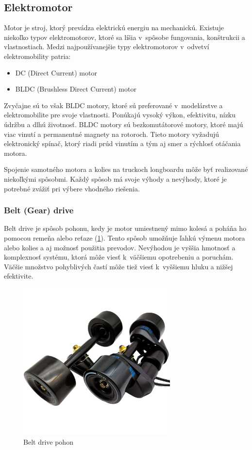 \subsection{Elektromotor}
Motor je stroj, ktorý prevádza elektrickú energiu na mechanickú.
Existuje niekoľko typov elektromotorov, ktoré sa líšia v~spôsobe fungovania, konštrukcii a vlastnostiach.
Medzi najpoužívanejšie typy elektromotorov v~odvetví elektromobility patria:
\begin{itemize}
    \item {DC (Direct Current) motor}
    \item {BLDC (Brushless Direct Current) motor}
\end{itemize}
Zvyčajne sú to však BLDC motory, ktoré sú preferované v~modelárstve a elektromobilite pre svoje vlastnosti.
Ponúkajú vysoký výkon, efektivitu, nízku údržbu a dlhú životnosť.
BLDC motory sú bezkomutátorové motory, ktoré majú viac vinutí a permanentné magnety na rotoroch.
Tieto motory vyžadujú elektronický spínač, ktorý riadi prúd vinutím a tým aj smer a rýchlosť otáčania motora.\cite{Teja}

\bigskip

Spojenie samotného motora a kolies na truckoch longboardu môže byť realizované niekoľkými spôsobmi.
Každý spôsob má svoje výhody a nevýhody, ktoré je potrebné zvážiť pri výbere vhodného riešenia.

\newpage

\subsubsection{Belt (Gear) drive}
Belt drive je spôsob pohonu, kedy je motor umiestnený mimo kolesá a poháňa ho pomocou remeňa alebo reťaze (\ref{fig:belt-drive}).
Tento spôsob umožňuje ľahkú výmenu motora alebo kolies a aj možnosť použitia prevodov.
Nevýhodou je vyššia hmotnosť a komplexnosť systému, ktorá môže viesť k~väčšiemu opotrebeniu a poruchám.
Väčšie množstvo pohyblivých častí môže tiež viesť k~vyššiemu hluku a nižšej efektivite.\cite{WikiElectricSkateboard}

\begin{figure}[h]
    \centering
    \includegraphics[height=8cm, width=1\linewidth, keepaspectratio]{figures/drive-belt.png}
    \caption{Belt drive pohon\cite{Puaida}}\label{fig:belt-drive}
\end{figure}

